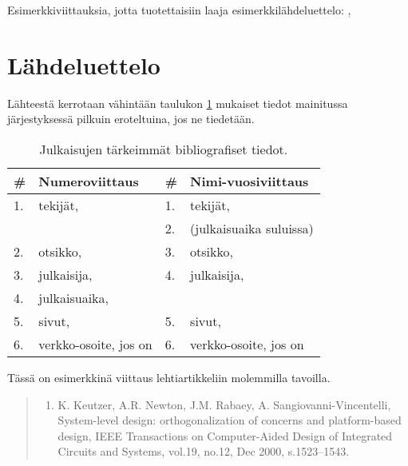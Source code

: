 \documentclass[globalnumbering,centeredcaptions,draftfooter]{tutthesis/tutthesis} %
\begin{document}
Esimerkkiviittauksia, jotta tuotettaisiin laaja esimerkkilähdeluettelo: \citep{Weber2001} \citep{Cattaneo2004} \citep{Kaunisto2003} \citep{Li2004} \citep{Ho-Ching2003} \citep{Puhakka2004} \citep{Nissinen2011} \citep{Ohlstrom2005} \citep{OMAP4430} \citep{InjectionMolding2005} \citep{Raakakk2002} \citep{Intel2013} \citep{Davies2004} \citep{SFSISO1000A1} \citep{Keskinen2005} \citep{Sahkoturvallisuuslaki1996} \citep{Pan2013} \citep{Tty2005} \citep{ConstInorgComp2005}, \citep{Radionuklidit2003} \citep{Kalkkihiekkatiilet2004} \citep{Miettinen2005}


\section{Lähdeluettelo}

Lähteestä kerrotaan vähintään taulukon \ref{tab:bibliografiset-tiedot} mukaiset tiedot mainitussa järjestyksessä pilkuin eroteltuina, jos ne tiedetään.

\begin{table}[ht!]
\caption{Julkaisujen tärkeimmät bibliografiset tiedot.}
\label{tab:bibliografiset-tiedot}
\begin{tabular}{l l | l l}
\hline
\textbf{\#} & \textbf{Numeroviittaus} & \# & \textbf{Nimi-vuosiviittaus} \\
\hline \hline
1. & tekijät, & 1. & tekijät,\\
& & 2. & (julkaisuaika suluissa) \\
2. & otsikko, & 3. & otsikko, \\
3. & julkaisija, & 4. & julkaisija, \\
4. & julkaisuaika, & \\
5. & sivut, & 5. & sivut, \\
6. & verkko-osoite, jos on & 6. & verkko-osoite, jos on \\
\hline
\end{tabular}
\end{table}

Tässä on esimerkkinä viittaus lehtiartikkeliin molemmilla tavoilla.

\begin{quotation}
\small
\begin{enumerate}
  \renewcommand*\labelenumi{[\theenumi]}
  \setcounter{enumi}{99}
  \item K. Keutzer, A.R. Newton, J.M. Rabaey, A. Sangiovanni-Vincentelli, System-level design: orthogonalization of concerns and platform-based design, IEEE Transactions on Computer-Aided Design of Integrated Circuits and Systems, vol.19, no.12, Dec 2000, s.1523--1543.
\end{enumerate}
\end{quotation}
\end{document}
